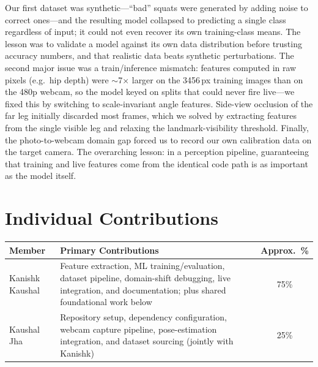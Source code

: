 \documentclass[11pt, letterpaper]{article}
\begin{document}
Our first dataset was synthetic---``bad'' squats were generated by adding noise
to correct ones---and the resulting model collapsed to predicting a single
class regardless of input; it could not even recover its own training-class
means. The lesson was to validate a model against its own data distribution
before trusting accuracy numbers, and that realistic data beats synthetic
perturbations. The second major issue was a train/inference mismatch: features
computed in raw pixels (e.g.\ hip depth) were $\sim$7$\times$ larger on the
3456\,px training images than on the 480p webcam, so the model keyed on splits
that could never fire live---we fixed this by switching to scale-invariant
angle features. Side-view occlusion of the far leg initially discarded most
frames, which we solved by extracting features from the single visible leg and
relaxing the landmark-visibility threshold. Finally, the photo-to-webcam domain
gap forced us to record our own calibration data on the target camera. The
overarching lesson: in a perception pipeline, guaranteeing that training and
live features come from the identical code path is as important as the model
itself.

\section{Individual Contributions}
\begin{tcolorbox}[sectionbox, height=2.6cm, valign=top]
  \vspace{2pt}
  \centering
  \begin{tabularx}{0.95\textwidth}{l X c}
    \toprule
    \textbf{Member} & \textbf{Primary Contributions} & \textbf{Approx.\ \%} \\
    \midrule
    Kanishk Kaushal & Feature extraction, ML training/evaluation, dataset pipeline, domain-shift debugging, live integration, and documentation; plus shared foundational work below & 75\% \\
    Kaushal Jha & Repository setup, dependency configuration, webcam capture pipeline, pose-estimation integration, and dataset sourcing (jointly with Kanishk) & 25\% \\
    \bottomrule
  \end{tabularx}
\end{tcolorbox}

\end{document}
